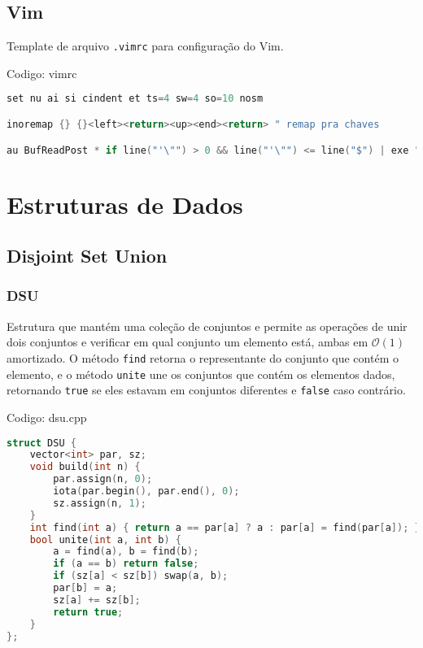 \documentclass[10pt, a4paper, oneside]{book}
\begin{document}
\section{Vim}


Template de arquivo \texttt{.vimrc} para configuração do Vim.

\hfill

Codigo: vimrc

\begin{lstlisting}[language=C++]
set nu ai si cindent et ts=4 sw=4 so=10 nosm

inoremap {} {}<left><return><up><end><return> " remap pra chaves

au BufReadPost * if line("'\"") > 0 && line("'\"") <= line("$") | exe "normal! g'\"" | endif " volta pro lugar onde estava quando saiu do arquivo
\end{lstlisting}
\hfill

\newpage

%
%
%
%

\chapter{Estruturas de Dados}

\section{Disjoint Set Union}
\subsection{DSU}


Estrutura que mantém uma coleção de conjuntos e permite as operações de unir dois conjuntos e verificar em qual conjunto um elemento está, ambas em $\mathcal{O}(1)$ amortizado. O método \texttt{find} retorna o representante do conjunto que contém o elemento, e o método \texttt{unite} une os conjuntos que contém os elementos dados, retornando \texttt{true} se eles estavam em conjuntos diferentes e \texttt{false} caso contrário.

\hfill

Codigo: dsu.cpp

\begin{lstlisting}[language=C++]
struct DSU {
    vector<int> par, sz;
    void build(int n) {
        par.assign(n, 0);
        iota(par.begin(), par.end(), 0);
        sz.assign(n, 1);
    }
    int find(int a) { return a == par[a] ? a : par[a] = find(par[a]); }
    bool unite(int a, int b) {
        a = find(a), b = find(b);
        if (a == b) return false;
        if (sz[a] < sz[b]) swap(a, b);
        par[b] = a;
        sz[a] += sz[b];
        return true;
    }
};
\end{lstlisting}
\hfill
\end{document}
